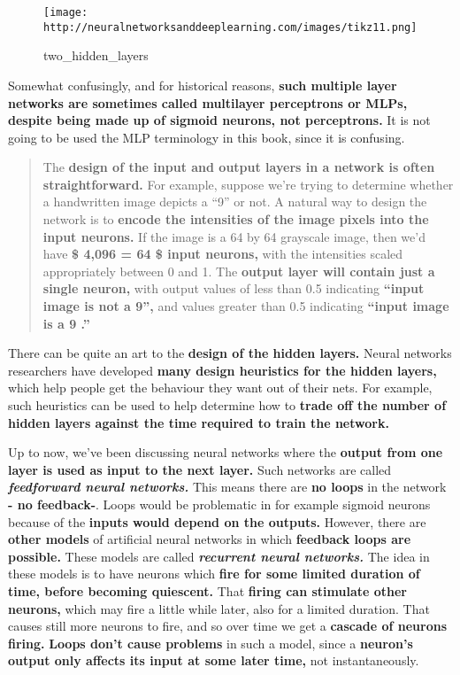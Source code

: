 \documentclass[]{article}
\begin{document}
\begin{figure}[htbp]
\centering
\texttt{[image: http://neuralnetworksanddeeplearning.com/images/tikz11.png]}
\caption{two\_hidden\_layers}
\end{figure}

Somewhat confusingly, and for historical reasons, \textbf{such multiple
layer networks are sometimes called multilayer perceptrons or MLPs,
despite being made up of sigmoid neurons, not perceptrons.} It is not
going to be used the MLP terminology in this book, since it is
confusing.

\begin{quote}
The \textbf{design of the input and output layers in a network is often
straightforward.} For example, suppose we're trying to determine whether
a handwritten image depicts a ``9'' or not. A natural way to design the
network is to \textbf{encode the intensities of the image pixels into
the input neurons.} If the image is a 64 by 64 grayscale image, then
we'd have \textbf{\$ 4,096 = 64  \$ input neurons,} with the
intensities scaled appropriately between 0 and 1. The \textbf{output
layer will contain just a single neuron,} with output values of less
than 0.5 indicating \textbf{``input image is not a 9'',} and values
greater than 0.5 indicating \textbf{``input image is a 9 .''}
\end{quote}

There can be quite an art to the \textbf{design of the hidden layers.}
Neural networks researchers have developed \textbf{many design
heuristics for the hidden layers,} which help people get the behaviour
they want out of their nets. For example, such heuristics can be used to
help determine how to \textbf{trade off the number of hidden layers
against the time required to train the network.}

Up to now, we've been discussing neural networks where the
\textbf{output from one layer is used as input to the next layer.} Such
networks are called \textbf{\emph{feedforward neural networks.}} This
means there are \textbf{no loops} in the network \textbf{- no
feedback-}. Loops would be problematic in for example sigmoid neurons
because of the \textbf{inputs would depend on the outputs.} However,
there are \textbf{other models} of artificial neural networks in which
\textbf{feedback loops are possible.} These models are called
\textbf{\emph{recurrent neural networks.}} The idea in these models is
to have neurons which \textbf{fire for some limited duration of time,
before becoming quiescent.} That \textbf{firing can stimulate other
neurons,} which may fire a little while later, also for a limited
duration. That causes still more neurons to fire, and so over time we
get a \textbf{cascade of neurons firing.} \textbf{Loops don't cause
problems} in such a model, since a \textbf{neuron's output only affects
its input at some later time,} not instantaneously.
\end{document}
